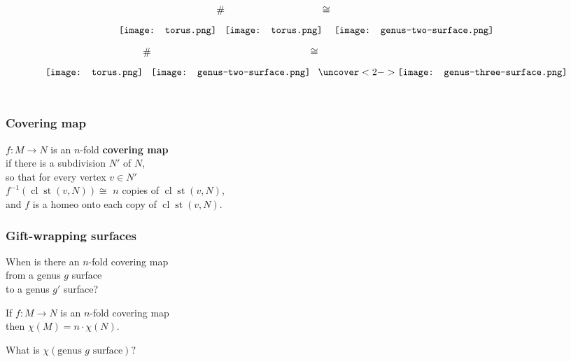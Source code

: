 \documentclass[14pt]{beamer}
\DeclareMathOperator{\st}{st}
\DeclareMathOperator{\cl}{cl}
\begin{document}
\begin{frame}
\vfill
$$
 \texttt{[image: torus.png]} \raisebox{0.06\textwidth}{$\#$}
 \texttt{[image: torus.png]}  \raisebox{0.06\textwidth}{$\cong$}
 \hspace{1ex}\texttt{[image: genus-two-surface.png]}
$$
\vfill
\end{frame}

\begin{frame}
\vfill
$$
 \texttt{[image: torus.png]} \raisebox{0.06\textwidth}{$\#$}
 \texttt{[image: genus-two-surface.png]}  \raisebox{0.06\textwidth}{$\cong$}
 \uncover<2->{\texttt{[image: genus-three-surface.png]}}
$$
\vfill
{}\\
\vspace{1ex}
\end{frame}

\begin{frame}
  \frametitle{Covering map}

  \begin{definition}
    $f : M \to N$ is an $n$-fold \textbf{covering map} \\
    if there is a subdivision $N'$ of $N$, \\
    so that for every vertex $v \in N'$ \\
    $f^{-1}(\cl \st(v,N)) \cong$ $n$ copies of $\cl \st(v, N)$, \\
    and $f$ is a homeo onto each copy of $\cl \st(v, N)$.
  \end{definition}

\end{frame}

\begin{frame}
  \frametitle{Gift-wrapping surfaces}

  \begin{problem}
    When is there an $n$-fold covering map \\
    from a genus $g$ surface \\
    to a genus $g'$ surface?
  \end{problem}
  \pause
  \begin{theorem}
    If $f : M \to N$ is an $n$-fold covering map \\
    then $\chi(M) = n \cdot \chi(N)$.
  \end{theorem}
  \pause
  \begin{problem}
    What is $\chi(\mbox{genus $g$ surface})?$
  \end{problem}

\end{frame}
\end{document}
